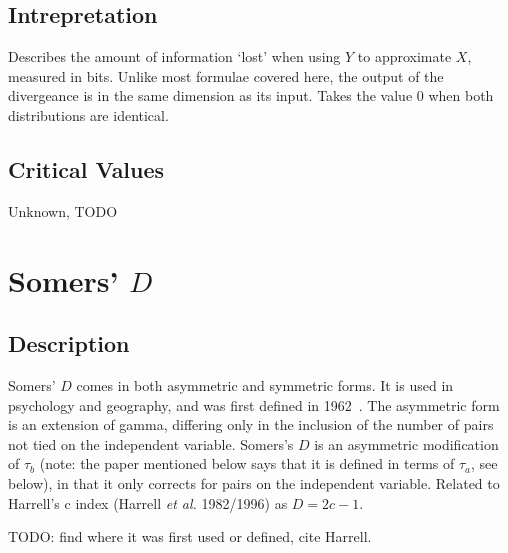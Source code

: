 \documentclass[11pt]{article}
\begin{document}
\subsection{Intrepretation}
Describes the amount of information `lost' when using $Y$ to approximate $X$, measured in bits.  Unlike most formulae covered here, the output of the divergeance is in the same dimension as its input.  Takes the value 0 when both distributions are identical.

\subsection{Critical Values}
Unknown, TODO








\section{Somers' $D$}
\label{section:somersd}
\subsection{Description}
Somers' $D$ comes in both asymmetric and symmetric forms.  It is used in psychology and geography, and was first defined in 1962~\cite{somers1962new}.
The asymmetric form is an extension of gamma, differing only in the inclusion of the number of pairs not tied on the independent variable.  
Somers's $D$ is an asymmetric modification of $\tau_b$ (note: the paper mentioned below says that it is defined in terms of $\tau_a$, see below), in that it only corrects for pairs on the independent variable.  
Related to Harrell's c index (Harrell \textsl{et al.} 1982/1996) as $D = 2c - 1$.

TODO: find where it was first used or defined, cite Harrell.
\end{document}
